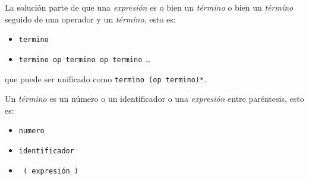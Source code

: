 La solución parte de que una {\it expresión} es o bien un {\it término} o bien 
un {\it término} seguido de una operador y un {\it término}, esto es:

\begin{itemize}
\item \verb|termino|
\item \verb|termino op termino op termino| \ldots
\end{itemize}
que puede ser unificado como \verb|termino (op termino)*|.
  
Un {\it término} es un número o un identificador o una {\it expresión}
entre paréntesis, esto es:

\begin{itemize}
\item \verb|numero|
\item \verb|identificador|
\item \verb| ( expresión ) |
\end{itemize}
 
